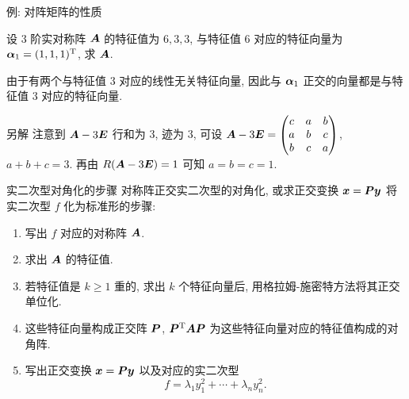 \begin{frame}{例: 对阵矩阵的性质}\small
\beqskip{5pt}
	\onslide<+->
	\begin{example}
		设 $3$ 阶实对称阵 ${\boldsymbol{A}}$ 的特征值为 $6,3,3$, 与特征值 $6$ 对应的特征向量为 ${\boldsymbol{\alpha}}_1=(1,1,1)^{\mathrm{T}}$, 求 ${\boldsymbol{A}}$. 
	\end{example}
	\onslide<+->
	\begin{solution}
		由于有两个与特征值 $3$ 对应的线性无关特征向量, 因此与 ${\boldsymbol{\alpha}}_1$ 正交的向量都是与特征值 $3$ 对应的特征向量.
		\vspace{-.5\baselineskip}
	\end{solution}
	\onslide<+->
	\begin{solution}{另解}
		注意到 ${\boldsymbol{A}}-3{\boldsymbol{E}}$ 行和为 $3$, 迹为 $3$, 可设 ${\boldsymbol{A}}-3{\boldsymbol{E}}=\begin{pmatrix}
			c&a&b\\
			a&b&c\\
			b&c&a
		\end{pmatrix}$, $a+b+c=3$. 再由 $R({\boldsymbol{A}}-3{\boldsymbol{E}})=1$ 可知 $a=b=c=1$.
	\end{solution}
\endgroup
\end{frame}


\begin{frame}{实二次型对角化的步骤}
	\onslide<+->
	对称阵正交实二次型的对角化, 或求正交变换 ${\boldsymbol{x}}={\boldsymbol{P}}{\boldsymbol{y}}$ 将实二次型 $f$ 化为标准形的步骤:
	\begin{enumerate}
		\item 写出 $f$ 对应的对称阵 ${\boldsymbol{A}}$.
		\item 求出 ${\boldsymbol{A}}$ 的特征值.
		\item \alert{若特征值是 $k\ge1$ 重的, 求出 $k$ 个特征向量后, 用格拉姆-施密特方法将其正交单位化.}
		\item 这些特征向量构成正交阵 ${\boldsymbol{P}}$, ${\boldsymbol{P}}^{\mathrm{T}}{\boldsymbol{A}}{\boldsymbol{P}}$ 为这些特征向量对应的特征值构成的对角阵.
		\item 写出正交变换 ${\boldsymbol{x}}={\boldsymbol{P}}{\boldsymbol{y}}$ 以及对应的实二次型
		\[f=\lambda_1 y_1^2+\cdots+\lambda_n y_n^2.\]
	\end{enumerate}
\end{frame}


